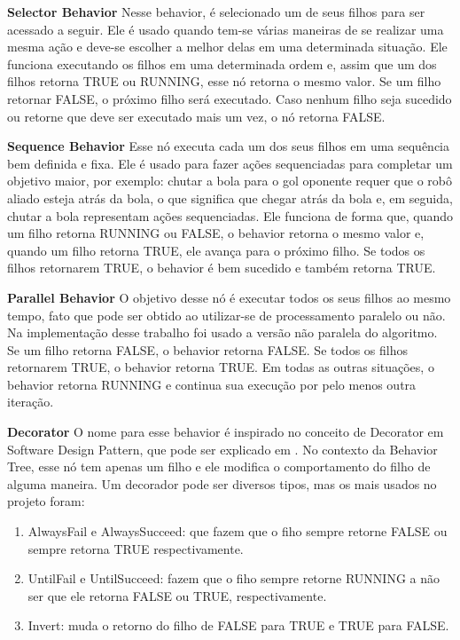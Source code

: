 \documentclass[10pt,fleqn,a4paper]{article}
\begin{document}
\textbf{Selector Behavior} Nesse behavior, é selecionado um de seus filhos para ser acessado a seguir. Ele é usado quando tem-se várias maneiras de se realizar uma mesma ação e deve-se escolher a melhor delas em uma determinada situação. Ele funciona executando os filhos em uma determinada ordem e, assim que um dos filhos retorna TRUE ou RUNNING, esse nó retorna o mesmo valor. Se um filho retornar FALSE, o próximo filho será executado. Caso nenhum filho seja sucedido ou retorne que deve ser executado mais um vez, o nó retorna FALSE.

\textbf{Sequence Behavior} Esse nó executa cada um dos seus filhos em uma sequência bem definida e fixa. Ele é usado para fazer ações sequenciadas para completar um objetivo maior, por exemplo: chutar a bola para o gol oponente requer que o robô aliado esteja atrás da bola, o que significa que chegar atrás da bola e, em seguida, chutar a bola representam ações sequenciadas. Ele funciona de forma que, quando um filho retorna RUNNING ou FALSE, o behavior retorna o mesmo valor e, quando um filho retorna TRUE, ele avança para o próximo filho. Se todos os filhos retornarem TRUE, o behavior é bem sucedido e também retorna TRUE.

\textbf{Parallel Behavior} O objetivo desse nó é executar todos os seus filhos ao mesmo tempo, fato que pode ser obtido ao utilizar-se de processamento paralelo ou não. Na implementação desse trabalho foi usado a versão não paralela do algoritmo. Se um filho retorna FALSE, o behavior retorna FALSE. Se todos os filhos retornarem TRUE, o behavior retorna TRUE. Em todas as outras situações, o behavior retorna RUNNING e continua sua execução por pelo menos outra iteração.

\textbf{Decorator} O nome para esse behavior é inspirado no conceito de Decorator em Software Design Pattern, que pode ser explicado em \cite{hunt2013gang}. No contexto da Behavior Tree, esse nó tem apenas um filho e ele modifica o comportamento do filho de alguma maneira. Um decorador pode ser diversos tipos, mas os mais usados no projeto foram:

\begin{enumerate}
\item AlwaysFail e AlwaysSucceed: que fazem que o fiho sempre retorne FALSE ou sempre retorna TRUE respectivamente.
\item UntilFail e UntilSucceed: fazem que o fiho sempre retorne RUNNING a não ser que ele retorna FALSE ou TRUE, respectivamente.
\item Invert: muda o retorno do filho de FALSE para TRUE e TRUE para FALSE.
\end{enumerate}
\end{document}

